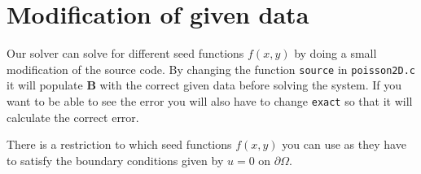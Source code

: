 
\section{Modification of given data} %
\label{sec:modification_of_given_data}
Our solver can solve for different seed functions $f(x,y)$ by doing a small modification of the source code. By changing the function \texttt{source} in \texttt{poisson2D.c} it will populate \textbf{B} with the correct given data before solving the system. If you want to be able to see the error you will also have to change \texttt{exact} so that it will calculate the correct error. 

There is a restriction to which seed functions $f(x,y)$ you can use as they have to satisfy the boundary conditions given by $u = 0$ on $\partial\Omega$.	
